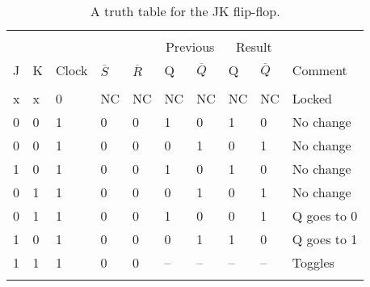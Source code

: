 \documentclass[12pt]{article}
\begin{document}
\begin{table}

\begin{tabular}{ll l ll ll ll l}
\hline\\[\negsep]
  &   &       & &  &  \multicolumn{2}{c}{Previous} & \multicolumn{2}{c}{Result} & \\
J & K & Clock & $\overline{S}$ & $\overline{R}$ & Q & $\overline{Q}$ & Q & $\overline{Q}$ & Comment\\[\sep]
\hline\\[\negsep]
 x & x  & 0 & NC & NC & NC & NC & NC & NC & Locked \\[\sep]

 0 & 0  & 1 & 0  & 0  & 1  & 0 & 1  & 0 & No change \\[\sep]
 
 0 & 0  & 1 & 0  & 0  & 0  & 1 & 0  & 1 & No change \\[\sep]

 1 & 0  & 1 & 0  & 0  & 1  & 0 & 1  & 0 & No change \\[\sep]
 
 0 & 1  & 1 & 0  & 0  & 0  & 1 & 0  & 1 & No change \\[\sep]
 
 0 & 1  & 1 & 0  & 0  & 1  & 0 & 0  & 1 & Q goes to 0 \\[\sep]

 1 & 0  & 1 & 0  & 0  & 0  & 1 & 1  & 0 & Q goes to 1 \\[\sep]
 
 1 & 1  & 1 & 0  & 0  & --  & -- & --  & -- & Toggles \\[\sep]
 
 \hline\\[\negsep]

 




\end{tabular}
\caption{A truth table for the JK flip-flop.}
\end{table}
\end{document}
